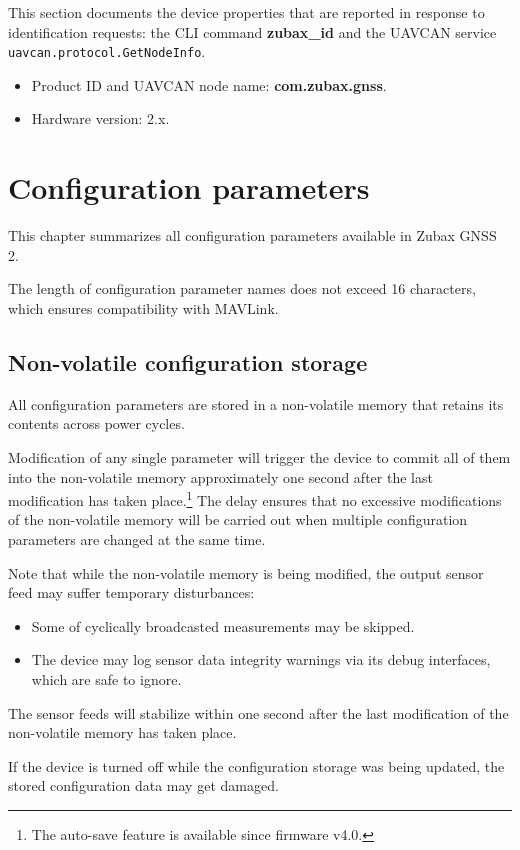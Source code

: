\documentclass{zubaxdoc}
\begin{document}
This section documents the device properties that are reported in response to identification requests: the CLI command \textbf{zubax{\_}id} and the UAVCAN service \texttt{uavcan.protocol.GetNodeInfo}.
\begin{itemize}
\item Product ID and UAVCAN node name: \textbf{com.zubax.gnss}.
\item Hardware version: 2.x.
\end{itemize}

\chapter{Configuration parameters}\label{sec:configuration_parameters}

This chapter summarizes all configuration parameters available in Zubax GNSS 2.

The length of configuration parameter names does not exceed 16 characters,
which ensures compatibility with MAVLink.

\section{Non-volatile configuration storage}

All configuration parameters are stored in a non-volatile memory
that retains its contents across power cycles.

Modification of any single parameter will trigger the device to commit all of them into the non-volatile
memory approximately one second after the last modification has taken
place.\footnote{The auto-save feature is available since firmware v4.0.}
The delay ensures that no excessive modifications of the non-volatile memory will be carried out
when multiple configuration parameters are changed at the same time.

Note that while the non-volatile memory is being modified,
the output sensor feed may suffer temporary disturbances:
\begin{itemize}
    \item Some of cyclically broadcasted measurements may be skipped.
    \item The device may log sensor data integrity warnings via its debug interfaces, which are safe to ignore.
\end{itemize}
The sensor feeds will stabilize within one second after the last modification of the
non-volatile memory has taken place.

If the device is turned off while the configuration storage was being updated,
the stored configuration data may get damaged.
\end{document}
